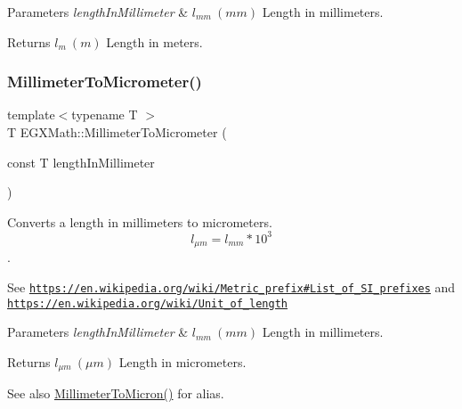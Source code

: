 \begin{DoxyParams}{Parameters}
{\em length\+In\+Millimeter} & $ l_{mm}\ (mm)$ Length in millimeters. \\
\hline
\end{DoxyParams}
\begin{DoxyReturn}{Returns}
$ l_{m}\ (m)$ Length in meters. 
\end{DoxyReturn}
\mbox{\label{group___e_g_x_math-_conversions-_length_conversions-_millimeter-_s_i_gadec5d89ecdd6bfe638f54ceffe0e0630}} 
\subsubsection{\texorpdfstring{Millimeter\+To\+Micrometer()}{MillimeterToMicrometer()}}
{\footnotesize\ttfamily template$<$typename T $>$ \\
T E\+G\+X\+Math\+::\+Millimeter\+To\+Micrometer (\begin{DoxyParamCaption}\item[{const T}]{length\+In\+Millimeter }\end{DoxyParamCaption})}



Converts a length in millimeters to micrometers. \[ l_{\mu m}=l_{mm} * 10^{3} \]. 

See \href{https://en.wikipedia.org/wiki/Metric_prefix#List_of_SI_prefixes}{\tt https\+://en.\+wikipedia.\+org/wiki/\+Metric\+\_\+prefix\#\+List\+\_\+of\+\_\+\+S\+I\+\_\+prefixes} and \href{https://en.wikipedia.org/wiki/Unit_of_length}{\tt https\+://en.\+wikipedia.\+org/wiki/\+Unit\+\_\+of\+\_\+length} 
\begin{DoxyParams}{Parameters}
{\em length\+In\+Millimeter} & $ l_{mm}\ (mm)$ Length in millimeters. \\
\hline
\end{DoxyParams}
\begin{DoxyReturn}{Returns}
$ l_{\mu m}\ (\mu m)$ Length in micrometers. 
\end{DoxyReturn}
\begin{DoxySeeAlso}{See also}
\mbox{\hyperlink{group___e_g_x_math-_conversions-_length_conversions-_millimeter-_non-_s_i_ga47eac74d2eeec20afc801e61d53f67a0}{Millimeter\+To\+Micron()}} for alias. 
\end{DoxySeeAlso}
\mbox{\label{group___e_g_x_math-_conversions-_length_conversions-_millimeter-_s_i_ga4ed79a00a348e87b09e55e34d852841c}} 
